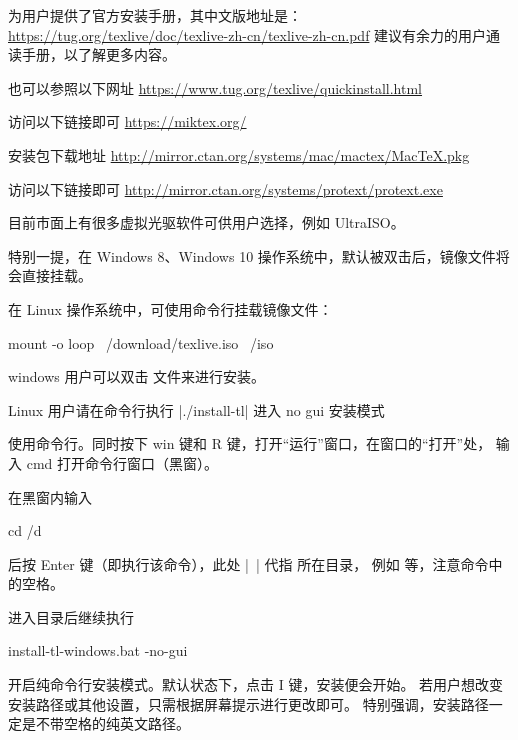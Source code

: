 
\TeXLive{} 为用户提供了官方安装手册，其中文版地址是：
\url{https://tug.org/texlive/doc/texlive-zh-cn/texlive-zh-cn.pdf}
建议有余力的用户通读手册，以了解更多内容。

也可以参照以下网址 \url{https://www.tug.org/texlive/quickinstall.html}


访问以下链接即可 \url{https://miktex.org/}


\MacTeX{} 安装包下载地址 \url{http://mirror.ctan.org/systems/mac/mactex/MacTeX.pkg}



访问以下链接即可 \url{http://mirror.ctan.org/systems/protext/protext.exe}



目前市面上有很多虚拟光驱软件可供用户选择，例如 UltraISO。

特别一提，在 Windows 8、Windows 10
操作系统中，默认被双击后，镜像文件将会直接挂载。

在 Linux 操作系统中，可使用命令行挂载镜像文件：
\begin{shcode}
  mount -o loop ~/download/texlive.iso ~/iso
\end{shcode}



windows 用户可以双击  文件来进行安装。

Linux 用户请在命令行执行 |./install-tl| 进入 no gui 安装模式



使用命令行。同时按下 win 键和 R 键，打开“运行”窗口，在窗口的“打开”处，
输入 cmd 打开命令行窗口（黑窗）。

在黑窗内输入
\begin{shcode}
  cd /d ~
\end{shcode}
后按 Enter 键（即执行该命令），此处 |~| 代指  
所在目录，
例如  等，注意命令中的空格。

进入目录后继续执行
\begin{shcode}
  install-tl-windows.bat -no-gui
\end{shcode}
开启纯命令行安装模式。默认状态下，点击 I 键，安装便会开始。
若用户想改变安装路径或其他设置，只需根据屏幕提示进行更改即可。
特别强调，安装路径一定是不带空格的纯英文路径。


